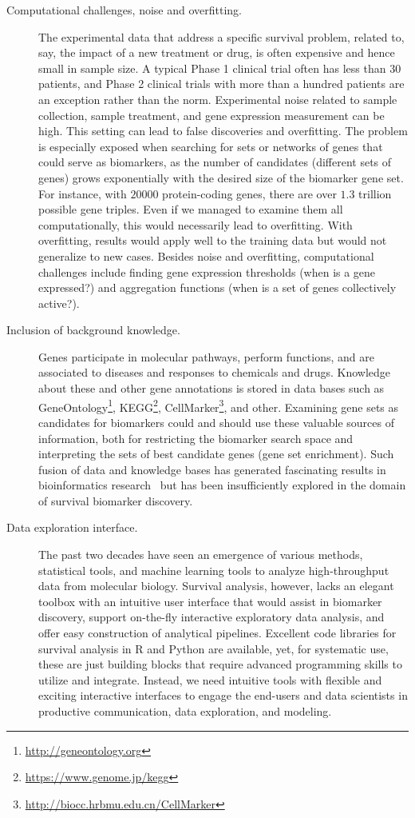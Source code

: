 \documentclass[11pt,a4paper]{article}
\newcommand{\myurl}[1]{\footnote{\url{#1}}}
\begin{document}
\begin{description}
	\item[Computational challenges, noise and overfitting.] The experimental data that address a specific survival problem, related to, say, the impact of a new treatment or drug, is often expensive and hence small in sample size. A typical Phase 1 clinical trial often has less than 30 patients, and Phase 2 clinical trials with more than a hundred patients are an exception rather than the norm. Experimental noise related to sample collection, sample treatment, and gene expression measurement can be high. This setting can lead to false discoveries and overfitting. The problem is especially exposed when searching for sets or networks of genes that could serve as biomarkers, as the number of candidates (different sets of genes) grows exponentially with the desired size of the biomarker gene set. For instance, with $20000$ protein-coding genes, there are over $1.3$ trillion possible gene triples. Even if we managed to examine them all computationally, this would necessarily lead to overfitting. With overfitting, results would apply well to the training data but would not generalize to new cases. Besides noise and overfitting, computational challenges include finding gene expression thresholds (when is a gene expressed?) and aggregation functions (when is a set of genes collectively active?).
 	\item[Inclusion of background knowledge.] Genes participate in molecular pathways, perform functions, and are associated to diseases and responses to chemicals and drugs. Knowledge about these and other gene annotations is stored in data bases such as GeneOntology\myurl{http://geneontology.org}, KEGG\myurl{https://www.genome.jp/kegg}, CellMarker\myurl{http://biocc.hrbmu.edu.cn/CellMarker}, and other. Examining gene sets as candidates for biomarkers could and should use these valuable sources of information, both for restricting the biomarker search space and interpreting the sets of best candidate genes (gene set enrichment). Such fusion of data and knowledge bases has generated fascinating results in bioinformatics research~\cite{pmid30467459,pmid26465776} but has been insufficiently explored in the domain of survival biomarker discovery.
 	\item[Data exploration interface.] The past two decades have seen an emergence of various methods, statistical tools, and machine learning tools to analyze high-throughput data from molecular biology. Survival analysis, however, lacks an elegant toolbox with an intuitive user interface that would assist in biomarker discovery, support on-the-fly interactive exploratory data analysis, and offer easy construction of analytical pipelines. Excellent code libraries for survival analysis in R and Python are available, yet, for systematic use, these are just building blocks that require advanced programming skills to utilize and integrate. Instead, we need intuitive tools with flexible and exciting interactive interfaces to engage the end-users and data scientists in productive communication, data exploration, and modeling.
\end{description}
\end{document}
